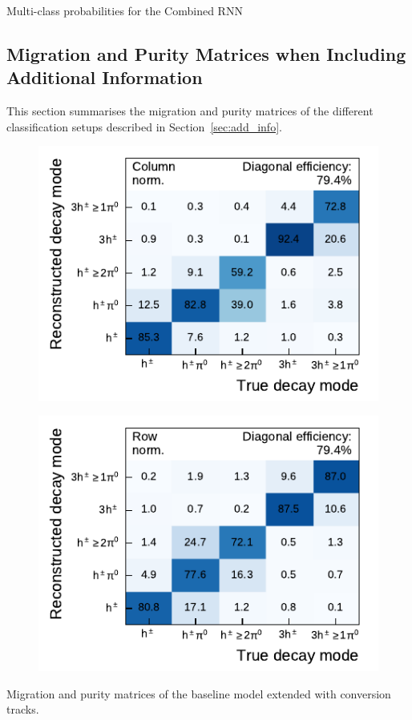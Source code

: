 \begin{minipage}{\textwidth}
\begin{subfigure}{0.48\textwidth}
  \end{subfigure}%

  \caption{Multi-class probabilities for the Combined RNN}
  \label{fig:rnn_multiclass_proba_combined}
\end{minipage}

\clearpage
\subsection{Migration and Purity Matrices when Including Additional Information}
\label{sec:app_decay_mode_exp}

This section summarises the migration and purity matrices of the different
classification setups described in Section~\ref{sec:add_info}.

\vfill

\noindent
\begin{minipage}{\textwidth}
  \captionsetup{type=figure}
  \begin{subfigure}[t]{0.48\textwidth}
    \centering
    \includegraphics{./figures/decay_mode_classification/experiments/mig_mat_conversions.pdf}
  \end{subfigure}\hfill
  \begin{subfigure}[t]{0.48\textwidth}
    \centering
    \includegraphics{./figures/decay_mode_classification/experiments/comp_mat_conversions.pdf}
  \end{subfigure}
  \caption{Migration and purity matrices of the baseline model extended with
    conversion tracks.}
\end{minipage}
